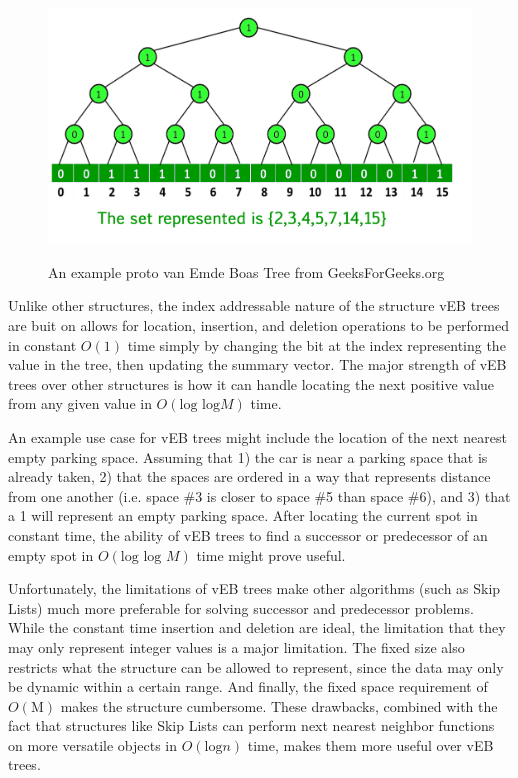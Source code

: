 \documentclass{article}
\begin{document}
\begin{figure}[h]
    \centering
    \includegraphics[width=\textwidth,keepaspectratio]{Images/vEB_tree_GFG.jpg}
    \label{fig: vEB}
    \caption{An example proto van Emde Boas Tree from GeeksForGeeks.org}
\end{figure}

Unlike other structures, the index addressable nature of the structure vEB trees are buit on allows for location, insertion, and deletion operations to be performed in constant $O(\text{1})$ time simply by changing the bit at the index representing the value in the tree, then updating the summary vector. The major strength of vEB trees over other structures is how it can handle locating the next positive value from any given value in $O(\text{log log} M)$ time.

An example use case for vEB trees might include the location of the next nearest empty parking space. Assuming that 1) the car is near a parking space that is already taken, 2) that the spaces are ordered in a way that represents distance from one another (i.e. space \#3 is closer to space \#5 than space \#6), and 3) that a 1 will represent an empty parking space. After locating the current spot in constant time, the ability of vEB trees to find a successor or predecessor of an empty spot in $O(\text{log log } M)$ time might prove useful.

Unfortunately, the limitations of vEB trees make other algorithms (such as Skip Lists) much more preferable for solving successor and predecessor problems. While the constant time insertion and deletion are ideal, the limitation that they may only represent integer values is a major limitation. The fixed size also restricts what the structure can be allowed to represent, since the data may only be dynamic within a certain range. And finally, the fixed space requirement of $O(\text{M})$ makes the structure cumbersome. These drawbacks, combined with the fact that structures like Skip Lists can perform next nearest neighbor functions on more versatile objects in $O(\text{log} n)$ time, makes them more useful over vEB trees.
\end{document}
